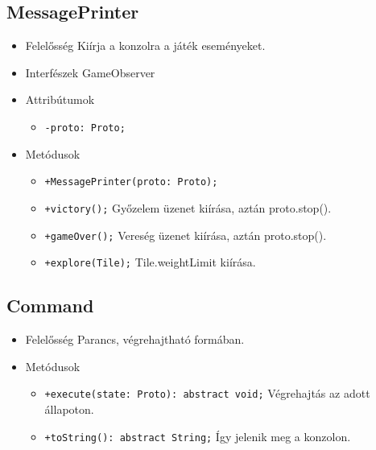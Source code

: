 \subsection{MessagePrinter}
\begin{itemize}
\item Felelősség\newline
Kiírja a konzolra a játék eseményeket.
\item Interfészek\newline
GameObserver
\item Attribútumok
	\begin{itemize}
		\item \texttt{-proto: Proto;}
	\end{itemize}
\item Metódusok
\begin{itemize}
		\item \texttt{+MessagePrinter(proto: Proto);}
		\item \texttt{+victory();} \newline
		Győzelem üzenet kiírása, aztán proto.stop().
		\item \texttt{+gameOver();} \newline
		Vereség üzenet kiírása, aztán proto.stop().
		\item \texttt{+explore(Tile);} \newline
		Tile.weightLimit kiírása.		
	\end{itemize}
\end{itemize}

\subsection{Command}
\begin{itemize}
\item Felelősség\newline
Parancs, végrehajtható formában.
\item Metódusok
\begin{itemize}
		\item \texttt{+execute(state: Proto): abstract void;} \newline
		Végrehajtás az adott állapoton.
		\item \texttt{+toString(): abstract String;} \newline
		Így jelenik meg a konzolon.
	\end{itemize}
\end{itemize}

